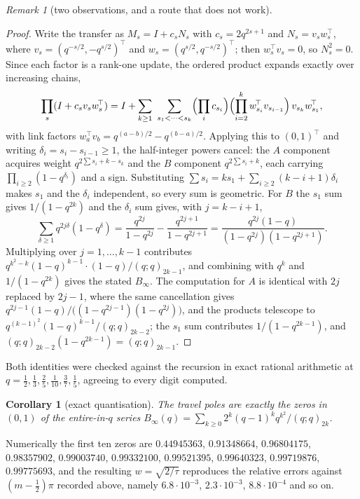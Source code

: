 \documentclass[11pt]{article}
\newtheorem{corollary}[theorem]{Corollary}
\theoremstyle{definition}
\theoremstyle{remark}
\newtheorem{remark}[theorem]{Remark}
\theoremstyle{definition}
\begin{document}
\begin{remark}[two observations, and a route that does not work]
\begin{proof}
Write the transfer as $M_s=I+c_sN_s$ with $c_s=2q^{2s+1}$ and $N_s=v_sw_s^{\!\top}$, where
$v_s=(q^{-s/2},-q^{s/2})^{\!\top}$ and $w_s=(q^{s/2},q^{-s/2})^{\!\top}$; then
$w_s^{\!\top}v_s=0$, so $N_s^2=0$. Since each factor is a rank-one update, the ordered product
expands exactly over increasing chains,
\[
  \prod_{s}(I+c_sv_sw_s^{\!\top})
  = I+\sum_{k\ge1}\ \sum_{s_1<\cdots<s_k}\Bigl(\prod_i c_{s_i}\Bigr)
     \Bigl(\prod_{i=2}^{k}w_{s_i}^{\!\top}v_{s_{i-1}}\Bigr)\,v_{s_k}w_{s_1}^{\!\top},
\]
with link factors $w_a^{\!\top}v_b=q^{(a-b)/2}-q^{(b-a)/2}$. Applying this to $(0,1)^{\!\top}$ and
writing $\delta_i=s_i-s_{i-1}\ge1$, the half-integer powers cancel: the $A$ component acquires
weight $q^{2\sum s_i+k-s_k}$ and the $B$ component $q^{2\sum s_i+k}$, each carrying
$\prod_{i\ge2}(1-q^{\delta_i})$ and a sign. Substituting
$\sum s_i=ks_1+\sum_{i\ge2}(k-i+1)\delta_i$ makes $s_1$ and the $\delta_i$ independent, so every
sum is geometric. For $B$ the $s_1$ sum gives $1/(1-q^{2k})$ and the $\delta_i$ sum gives, with
$j=k-i+1$,
\[
  \sum_{\delta\ge1}q^{2j\delta}(1-q^{\delta})
  =\frac{q^{2j}}{1-q^{2j}}-\frac{q^{2j+1}}{1-q^{2j+1}}
  =\frac{q^{2j}(1-q)}{(1-q^{2j})(1-q^{2j+1})} .
\]
Multiplying over $j=1,\dots,k-1$ contributes $q^{k^2-k}(1-q)^{k-1}\cdot(1-q)/(q;q)_{2k-1}$, and
combining with $q^{k}$ and $1/(1-q^{2k})$ gives the stated $B_\infty$. The computation for $A$ is
identical with $2j$ replaced by $2j-1$, where the same cancellation gives
$q^{2j-1}(1-q)/\bigl((1-q^{2j-1})(1-q^{2j})\bigr)$, and the products telescope to
$q^{(k-1)^2}(1-q)^{k-1}/(q;q)_{2k-2}$; the $s_1$ sum contributes $1/(1-q^{2k-1})$, and
$(q;q)_{2k-2}(1-q^{2k-1})=(q;q)_{2k-1}$.
\end{proof}

Both identities were checked against the recursion in exact rational arithmetic at
$q=\tfrac12,\tfrac13,\tfrac25,\tfrac1{10},\tfrac37,\tfrac15$, agreeing to every digit computed.

\begin{corollary}[exact quantisation]\label{cor:quant}
The travel poles are exactly the zeros in $(0,1)$ of the entire-in-$q$ series
$B_\infty(q)=\sum_{k\ge0}2^k(q-1)^kq^{k^2}/(q;q)_{2k}$.
\end{corollary}

Numerically the first ten zeros are $0.44945363$, $0.91348664$, $0.96804175$, $0.98357902$,
$0.99003740$, $0.99332100$, $0.99521395$, $0.99640323$, $0.99719876$, $0.99775693$, and the
resulting $w=\sqrt{2/\tau}$ reproduces the relative errors against $(m-\tfrac12)\pi$ recorded
above, namely $6.8\cdot10^{-3}$, $2.3\cdot10^{-3}$, $8.8\cdot10^{-4}$ and so on.


\end{remark}
\end{document}
